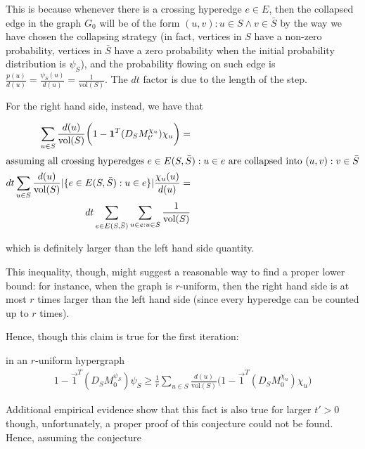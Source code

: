 \documentclass[../main.tex]{subfiles}
\begin{document}
    This is because whenever there is a crossing hyperedge $e\in E$, then the collapsed edge in the graph $G_0$ will be of the form $(u,v): u\in S \land v\in \bar{S}$ by the way we have chosen the collapsing strategy (in fact, vertices in $S$ have a non-zero probability, vertices in $\bar{S}$ have a zero probability when the initial probability distribution is $\psi_S$), and the probability flowing on such edge is $\frac{p(u)}{d(u)} = \frac{\psi_S(u)}{d(u)} = \frac{1}{\text{vol}(S)}$. The $dt$ factor is due to the length of the step. 
    
    For the right hand side, instead, we have that
    
    \begin{align}
        \sum_{u\in S}\frac{d(u)}{\text{vol}(S)} \bigg(1 - \vec{1}^T (D_S M_{t'}^{\chi_u})\chi_u\bigg) = \\
        \intertext{assuming all crossing hyperedges $e\in E(S,\bar{S}): u\in e$ are collapsed into $(u, v): v\in \bar{S}$}
        dt \sum_{u\in S}\frac{d(u)}{\text{vol}(S)} |\{e\in E(S,\bar{S}): u\in e\}| \frac{\chi_u(u)}{d(u)} = \\
        dt \sum_{e
        \in E(S, \bar{S})} \sum_{u\in e: u\in S} \frac{1}{\text{vol}(S)}
    \end{align}
    
    which is definitely larger than the left hand side quantity. 
    
    This inequality, though, might suggest a reasonable way to find a proper lower bound: for instance, when the graph is $r$-uniform, then the right hand side is at most $r$ times larger than the left hand side (since every hyperedge can be counted up to $r$ times).
    
    Hence, though this claim is true for the first iteration:
    \begin{claim}
    	in an $r$-uniform hypergraph
    	\begin{multline}
    		1 - \vec{1}^T(D_S M_{0}^{\psi_S}) \psi_S
    		 \geq \frac{1}{r} \sum_{u\in S} \frac{d(u)}{\text{vol}(S)}\bigg(1 - \vec{1}^T(D_S M_{0}^{\chi_u})\chi_u\bigg)
    	\end{multline}
    \end{claim}

    Additional empirical evidence show that this fact is also true for larger $t'>0$ though, unfortunately, a proper proof of this conjecture could not be found. Hence, assuming the conjecture
    
\end{document}
